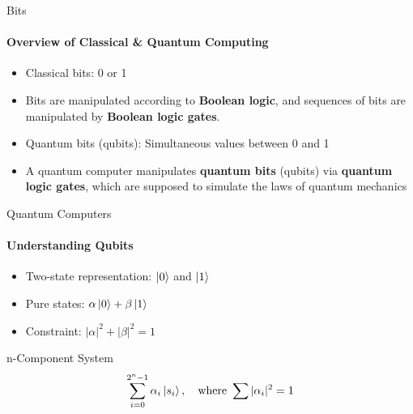 \documentclass{beamer}
\begin{document}


\begin{frame}{Bits}
	\framesubtitle{Overview of Classical \& Quantum Computing}
    \begin{itemize}
        \item Classical bits: 0 or 1
        \item[] Bits are manipulated according to \textbf{Boolean logic}, and sequences of bits are manipulated by \textbf{Boolean logic gates}.
        \item Quantum bits (qubits): Simultaneous values between 0 and 1
        \item[]  A quantum computer manipulates \textbf{quantum bits} (qubits) via \textbf{quantum logic gates}, which are supposed to simulate the laws of quantum mechanics \end{itemize}
\end{frame}




\begin{frame}{Quantum Computers}
	\framesubtitle{Understanding Qubits}
    \begin{itemize}
        \item Two-state representation: \(\ket{0}\) and \(\ket{1}\)
        \item Pure states: \(\alpha \ket{0} + \beta \ket{1}\)
        \item Constraint: \(|\alpha|^2 + |\beta|^2 = 1\)
    \end{itemize}
    \pause
    \begin{block}{n-Component System}
        \[ \sum_{i = 0}^{2^n - 1} \alpha_i \ket{s_i}, \quad \text{where } \sum |\alpha_i|^2 = 1 \]
    \end{block}
\end{frame}



\end{document}
